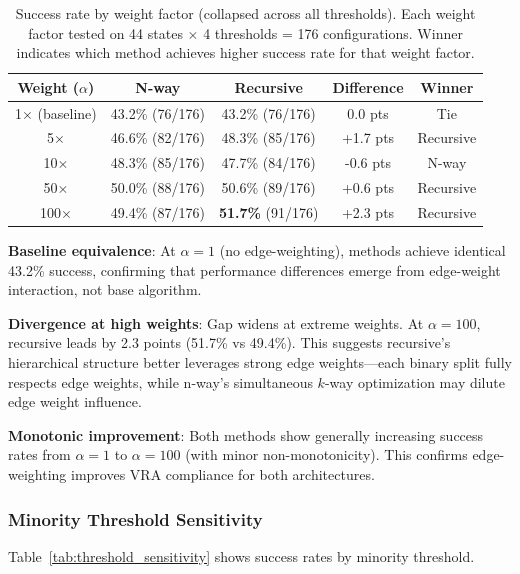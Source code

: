 \begin{table}[h]
\centering
\begin{tabular}{ccccc}
\toprule
\textbf{Weight ($\alpha$)} & \textbf{N-way} & \textbf{Recursive} & \textbf{Difference} & \textbf{Winner} \\
\midrule
1$\times$  (baseline) & 43.2\% (76/176) & 43.2\% (76/176) & 0.0 pts & Tie \\
5$\times$            & 46.6\% (82/176) & 48.3\% (85/176) & +1.7 pts & Recursive \\
10$\times$           & 48.3\% (85/176) & 47.7\% (84/176) & -0.6 pts & N-way \\
50$\times$           & 50.0\% (88/176) & 50.6\% (89/176) & +0.6 pts & Recursive \\
100$\times$          & 49.4\% (87/176) & \textbf{51.7\%} (91/176) & +2.3 pts & Recursive \\
\bottomrule
\end{tabular}
\caption{Success rate by weight factor (collapsed across all thresholds). Each weight factor tested on 44 states $\times$ 4 thresholds = 176 configurations. Winner indicates which method achieves higher success rate for that weight factor.}
\label{tab:weight_sensitivity}
\end{table}

\textbf{Baseline equivalence}: At $\alpha=1$ (no edge-weighting), methods achieve identical 43.2\% success, confirming that performance differences emerge from edge-weight interaction, not base algorithm.

\textbf{Divergence at high weights}: Gap widens at extreme weights. At $\alpha=100$, recursive leads by 2.3 points (51.7\% vs 49.4\%). This suggests recursive's hierarchical structure better leverages strong edge weights—each binary split fully respects edge weights, while n-way's simultaneous $k$-way optimization may dilute edge weight influence.

\textbf{Monotonic improvement}: Both methods show generally increasing success rates from $\alpha=1$ to $\alpha=100$ (with minor non-monotonicity). This confirms edge-weighting improves VRA compliance for both architectures.

\subsubsection{Minority Threshold Sensitivity}

Table~\ref{tab:threshold_sensitivity} shows success rates by minority threshold.

